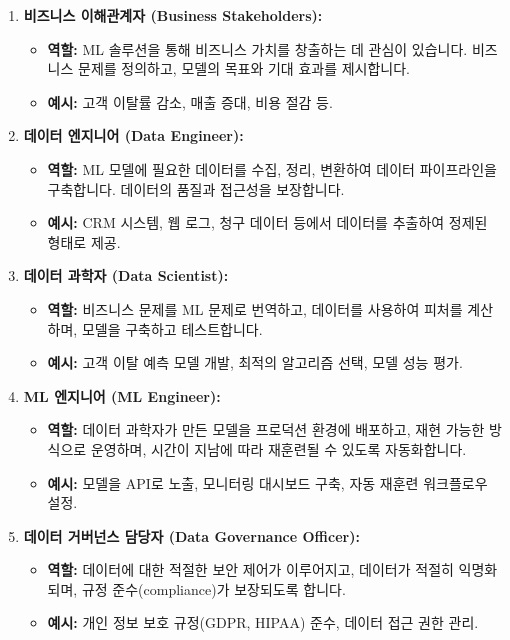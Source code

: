 \documentclass[11pt,a4paper]{article}
\begin{document}
\begin{enumerate}
    \item \textbf{비즈니스 이해관계자 (Business Stakeholders):}
    \begin{itemize}
        \item \textbf{역할:} ML 솔루션을 통해 비즈니스 가치를 창출하는 데 관심이 있습니다. 비즈니스 문제를 정의하고, 모델의 목표와 기대 효과를 제시합니다.
        \item \textbf{예시:} 고객 이탈률 감소, 매출 증대, 비용 절감 등.
    \end{itemize}

    \item \textbf{데이터 엔지니어 (Data Engineer):}
    \begin{itemize}
        \item \textbf{역할:} ML 모델에 필요한 데이터를 수집, 정리, 변환하여 데이터 파이프라인을 구축합니다. 데이터의 품질과 접근성을 보장합니다.
        \item \textbf{예시:} CRM 시스템, 웹 로그, 청구 데이터 등에서 데이터를 추출하여 정제된 형태로 제공.
    \end{itemize}

    \item \textbf{데이터 과학자 (Data Scientist):}
    \begin{itemize}
        \item \textbf{역할:} 비즈니스 문제를 ML 문제로 번역하고, 데이터를 사용하여 피처를 계산하며, 모델을 구축하고 테스트합니다.
        \item \textbf{예시:} 고객 이탈 예측 모델 개발, 최적의 알고리즘 선택, 모델 성능 평가.
    \end{itemize}

    \item \textbf{ML 엔지니어 (ML Engineer):}
    \begin{itemize}
        \item \textbf{역할:} 데이터 과학자가 만든 모델을 프로덕션 환경에 배포하고, 재현 가능한 방식으로 운영하며, 시간이 지남에 따라 재훈련될 수 있도록 자동화합니다.
        \item \textbf{예시:} 모델을 API로 노출, 모니터링 대시보드 구축, 자동 재훈련 워크플로우 설정.
    \end{itemize}

    \item \textbf{데이터 거버넌스 담당자 (Data Governance Officer):}
    \begin{itemize}
        \item \textbf{역할:} 데이터에 대한 적절한 보안 제어가 이루어지고, 데이터가 적절히 익명화되며, 규정 준수(compliance)가 보장되도록 합니다.
        \item \textbf{예시:} 개인 정보 보호 규정(GDPR, HIPAA) 준수, 데이터 접근 권한 관리.
    \end{itemize}
\end{enumerate}
\end{document}
